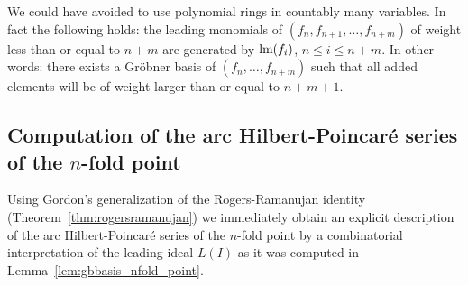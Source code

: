 

\begin{Rem}\label{rem:groebner_basis_in_infinitely_many_variables}
We could have avoided to use polynomial rings in countably many variables. In fact the following holds: the leading monomials of
$(f_n,f_{n+1},\ldots,f_{n+m})$ of weight less than or equal to $n+m$ are generated by $\textnormal{lm}(f_i)$, $n\leq i \leq n+m$. In other words: there exists a Gr\"{o}bner basis of $(f_n, \ldots, f_{n+m})$ such that all added elements will be of weight
larger than or equal to $n+m+1$. 
\end{Rem}

\subsection{Computation of the arc Hilbert-Poincar\'{e} series of the $n$-fold point}
Using Gordon's generalization of the Rogers-Ramanujan identity (Theorem~\ref{thm:rogersramanujan}) we immediately obtain an
explicit description of the arc Hilbert-Poincar\'{e} series of the $n$-fold point by a combinatorial interpretation of the leading ideal
$L(I)$ as it was computed
in Lemma~\ref{lem:gbbasis_nfold_point}.

